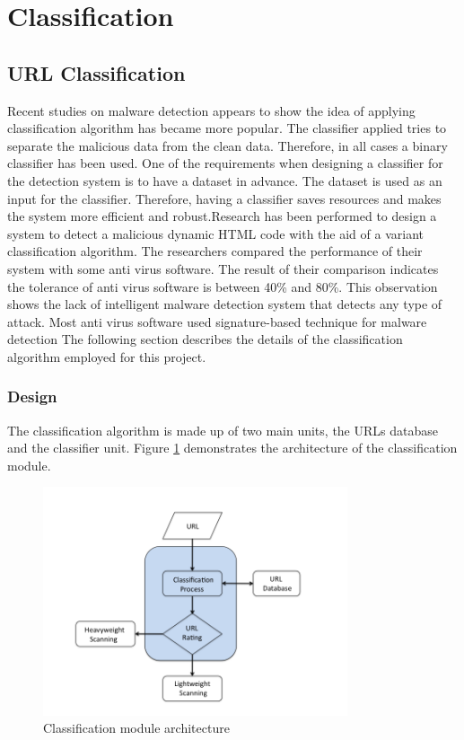 \section{Classification}

\subsection{URL Classification}

Recent studies on malware detection appears to show the idea of applying classification algorithm has became more popular. The classifier applied tries to separate the malicious data from the clean data. Therefore, in all cases a binary classifier has been used. One of the requirements when designing a classifier for the detection system is to have a dataset in advance. The dataset is used as an input for the classifier. Therefore, having a classifier saves resources and makes the system more efficient and robust.Research has been performed to design a system to detect a malicious dynamic HTML code with the aid of a variant classification algorithm. The researchers compared the performance of their system with some anti virus software. The result of their comparison indicates the tolerance of anti virus software is between 40\% and 80\%. This observation shows the lack of intelligent malware detection system that detects any type of attack. Most anti virus software used signature-based technique for malware detection\cite{Macilious-web}  
 The following section describes the details of the classification algorithm employed for this project. 
\subsubsection{Design}
The classification algorithm is made up of two main units, the URLs database and the classifier unit. Figure \ref{fig:clas-1} demonstrates the architecture of the classification module.

\begin{figure}[htb]
\centering
\includegraphics[width=0.8\textwidth]{img/classification(diag).png}
\caption{Classification module architecture}
\label{fig:clas-1}
\end{figure}

